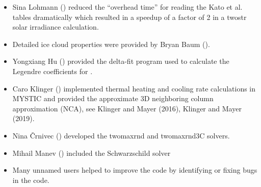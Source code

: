 \begin{itemize}
  TZS solver (thermal, zero scattering).
\item Sina Lohmann () reduced the ``overhead time''
  for reading the Kato et al. tables dramatically which resulted in 
  a speedup of a factor of 2 in a twostr solar irradiance calculation.
\item Detailed ice cloud properties were provided by Bryan Baum
  (). 
\item Yongxiang Hu () provided the delta-fit 
  program used to calculate the Legendre coefficients for .
\item Caro Klinger  () implemented
  thermal heating and cooling rate calculations in MYSTIC and provided the
  approximate 3D neighboring column approximation (NCA), see Klinger
  and Mayer (2016), Klinger and Mayer (2019).
\item Nina \v{C}rnivec  ()
  developed the twomaxrnd and twomaxrnd3C solvers.
\item Mihail Manev () included the Schwarzschild solver
\item Many unnamed users helped to improve the code by identifying 
  or fixing bugs in the code. 
\end{itemize}




